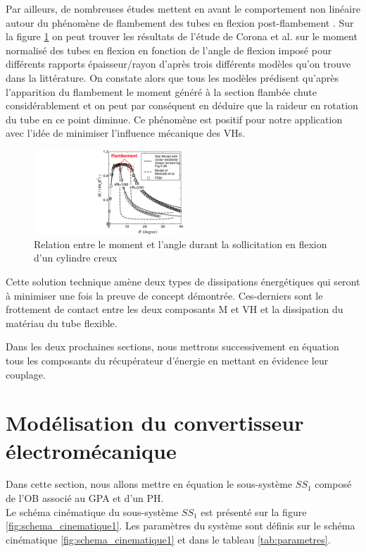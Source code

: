 Par ailleurs, de nombreuses études mettent en avant le comportement non linéaire autour du phénomène de flambement des tubes en flexion post-flambement \cite{Corona1996,Houliara2006,Ju1992,Liu2008}. Sur la figure \ref{fig:flambement_tubes_Chen2016} on peut trouver les résultats de l'étude de Corona et al. sur le moment normalisé des tubes en flexion en fonction de l'angle de flexion imposé pour différents rapports épaisseur/rayon d'après trois différents modèles qu'on trouve dans la littérature. On constate alors que tous les modèles prédisent qu'après l'apparition du flambement le moment généré à la section flambée chute considérablement et on peut par conséquent en déduire que la raideur en rotation du tube en ce point diminue. Ce phénomène est positif pour notre application avec l'idée de minimiser l'influence mécanique des VHs.
\begin{figure}[!htbp]
\begin{center}
    \captionsetup{justification=centering}
	\includegraphics[trim={14cm 0cm 0cm 0cm},clip,width=0.5\textwidth]{../Chap2/Figure/flambement_tubes_Chen2016.pdf}
	\caption{Relation entre le moment et l'angle durant la sollicitation en flexion d'un cylindre creux \cite{Chen2016}}
	\label{fig:flambement_tubes_Chen2016}
\end{center}	
\end{figure}
	
Cette solution technique amène deux types de dissipations énergétiques qui seront à minimiser une fois la preuve de concept démontrée. Ces-derniers sont le frottement de contact entre les deux composants M et VH et la dissipation du matériau du tube flexible.

Dans les deux prochaines sections, nous mettrons successivement en équation tous les composants du récupérateur d'énergie en mettant en évidence leur couplage.
\section{Modélisation du convertisseur électromécanique}
\label{sec:2.3_Modélisation du convertisseur électromécanique}
Dans cette section, nous allons mettre en équation le sous-système \emph{$SS_1$} composé de l'OB associé au GPA et d'un PH.\\
Le schéma cinématique du sous-système \emph{$SS_1$} est présenté sur la figure \ref{fig:schema_cinematique1}. Les paramètres du système  sont définis sur le schéma cinématique \ref{fig:schema_cinematique1} et dans le tableau \ref{tab:parametres}.

